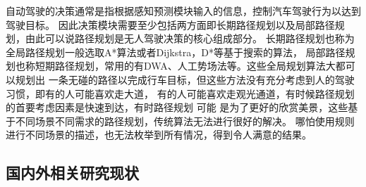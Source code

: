自动驾驶的决策通常是指根据感知预测模块输入的信息，控制汽车驾驶行为以达到驾驶目标。
因此决策模块需要至少包括两方面即长期路径规划以及局部路径规划，由此可以说路径规划是无人驾驶决策的核心组成部分。
长期路径规划也称为全局路径规划一般选取A*算法或者Dijkstra，D*等基于搜索的算法，
局部路径规划也称短期路径规划，常用的有DWA、人工势场法等。这些全局规划算法大都可以规划出
一条无碰的路径以完成行车目标，但这些方法没有充分考虑到人的驾驶习惯，即有的人可能喜欢走大道，
有的人可能喜欢走观光通道，有时候路径规划的首要考虑因素是快速到达，有时路径规划 可能
是为了更好的欣赏美景，这些基于不同场景不同需求的路径规划，传统算法无法进行很好的解决。
哪怕使用规则进行不同场景的描述，也无法枚举到所有情况，得到令人满意的结果。

\subsection{国内外相关研究现状}

